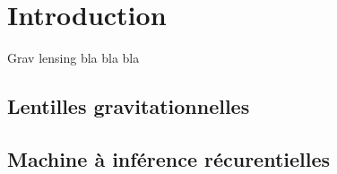 \chapter{Introduction}
Grav lensing bla bla bla
\thispagestyle{empty}
\section{Lentilles gravitationnelles}

\section{Machine à inférence récurentielles}

